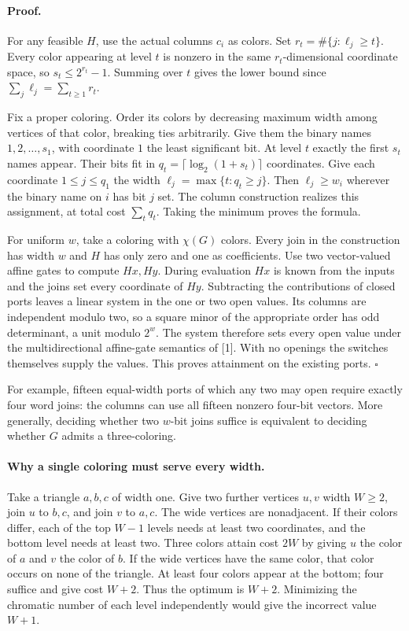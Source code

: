 \documentclass[11pt]{article}
\begin{document}
\paragraph{Proof.}
For any feasible $H$, use the actual columns $c_i$ as colors. Set $r_t=\#\{j:\ell_j\ge t\}$. Every color appearing at level $t$ is nonzero in the same $r_t$-dimensional coordinate space, so $s_t\le 2^{r_t}-1$. Summing over $t$ gives the lower bound since $\sum_j\ell_j=\sum_{t\ge1}r_t$.

Fix a proper coloring. Order its colors by decreasing maximum width among vertices of that color, breaking ties arbitrarily. Give them the binary names $1,2,\ldots,s_1$, with coordinate $1$ the least significant bit. At level $t$ exactly the first $s_t$ names appear. Their bits fit in $q_t=\lceil\log_2(1+s_t)\rceil$ coordinates. Give each coordinate $1\le j\le q_1$ the width $\ell_j=\max\{t:q_t\ge j\}$. Then $\ell_j\ge w_i$ wherever the binary name on $i$ has bit $j$ set. The column construction realizes this assignment, at total cost $\sum_t q_t$. Taking the minimum proves the formula.

For uniform $w$, take a coloring with $\chi(G)$ colors. Every join in the construction has width $w$ and $H$ has only zero and one as coefficients. Use two vector-valued affine gates to compute $Hx,Hy$. During evaluation $Hx$ is known from the inputs and the joins set every coordinate of $Hy$. Subtracting the contributions of closed ports leaves a linear system in the one or two open values. Its columns are independent modulo two, so a square minor of the appropriate order has odd determinant, a unit modulo $2^w$. The system therefore sets every open value under the multidirectional affine-gate semantics of [1]. With no openings the switches themselves supply the values. This proves attainment on the existing ports. \hfill$\square$

For example, fifteen equal-width ports of which any two may open require exactly four word joins: the columns can use all fifteen nonzero four-bit vectors. More generally, deciding whether two $w$-bit joins suffice is equivalent to deciding whether $G$ admits a three-coloring.

\paragraph{Why a single coloring must serve every width.}
Take a triangle $a,b,c$ of width one. Give two further vertices $u,v$ width $W\ge2$, join $u$ to $b,c$, and join $v$ to $a,c$. The wide vertices are nonadjacent. If their colors differ, each of the top $W-1$ levels needs at least two coordinates, and the bottom level needs at least two. Three colors attain cost $2W$ by giving $u$ the color of $a$ and $v$ the color of $b$. If the wide vertices have the same color, that color occurs on none of the triangle. At least four colors appear at the bottom; four suffice and give cost $W+2$. Thus the optimum is $W+2$. Minimizing the chromatic number of each level independently would give the incorrect value $W+1$.
\end{document}
